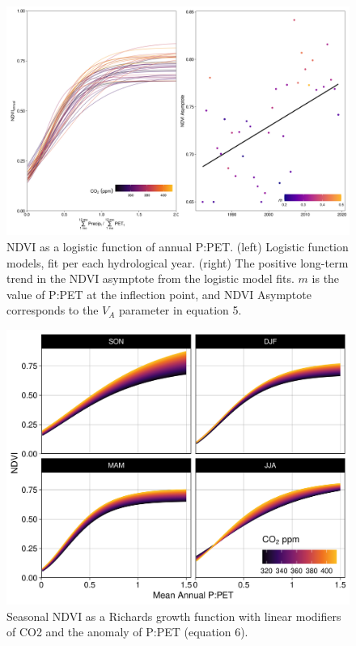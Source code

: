 \documentclass[gc, manuscript]{copernicus}
\begin{document}
\clearpage
\begin{figure}
\includegraphics[width=14cm]{../../figures/appendix-A/SM_Fig5_ndvi3mo_PE12mo_logistic_Asym_xmid} \caption{NDVI as a logistic function of annual P:PET. (left) Logistic function models, fit per each hydrological year. (right) The positive long-term trend in the NDVI asymptote from the logistic model fits. $m$ is the value of P:PET at the inflection point, and NDVI Asymptote corresponds to the $V_A$ parameter in equation 5.}\label{fig:FigA5}
\end{figure}
\clearpage

\clearpage
\begin{figure}
\includegraphics[width=14cm]{../../figures/appendix-A/SM_Fig6_ndvi3mo_PE12mo_richard_x3_nlsFit_bySeason} \caption{Seasonal NDVI as a Richards growth function with linear modifiers of CO2 and the anomaly of P:PET (equation 6). }\label{fig:FigA6}
\end{figure}
\clearpage
\end{document}
